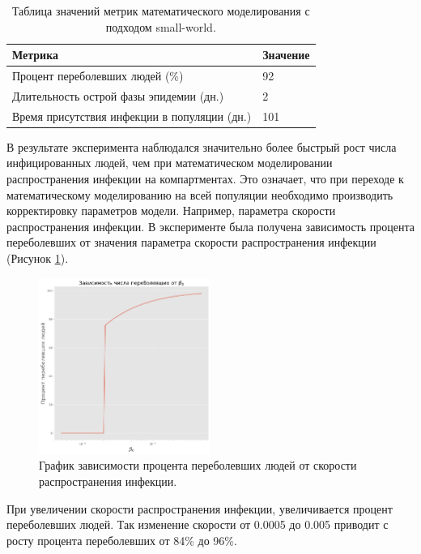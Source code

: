 \documentclass[14pt,a4paper]{article}
\begin{document}
\begin{table}[h!]
	\centering
	\caption{Таблица значений метрик математического моделирования с подходом small-world.}
	\begin{tabularx}{\textwidth}{|X|X|}
		\hline
		Метрика & Значение  \\ 
		\hline
		Процент переболевших людей (\%)& 92 \\ 
		\hline
		Длительность острой фазы эпидемии (дн.) & 2 \\ 
		\hline
	    Время присутствия инфекции в популяции (дн.) & 101 \\ 
		\hline
	\end{tabularx}
	\label{tab:results_no_comp}
\end{table}

В результате эксперимента наблюдался значительно более быстрый рост числа инфицированных людей, чем при математическом моделировании распространения инфекции на компартментах. Это означает, что при переходе к математическому моделированию на всей популяции необходимо производить корректировку параметров модели. Например, параметра скорости распространения инфекции. В эксперименте была получена зависимость процента переболевших от значения параметра скорости распространения инфекции  (Рисунок \ref{fig:sir_beta}).


\begin{figure}[h!]
	\centering
\vspace{-0.6cm}
\includegraphics[width=0.5\textwidth]{img/sir_beta.png}
\caption{График зависимости процента переболевших людей от скорости распространения инфекции.}
	\label{fig:sir_beta}
\end{figure}

 При увеличении скорости распространения инфекции, увеличивается процент переболевших людей. Так изменение скорости от 0.0005 до 0.005 приводит с росту процента переболевших от 84\% до 96\%.
\end{document}
